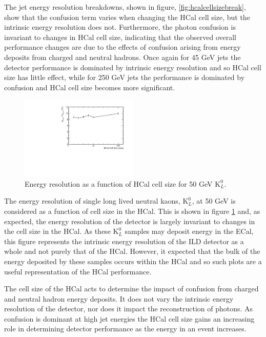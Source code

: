 The jet energy resolution breakdowns, shown in figure, \ref{fig:hcalcellsizebreak}, show that the confusion term varies when changing the HCal cell size, but the intrinsic energy resolution does not.  Furthermore, the photon confusion is invariant to changes in HCal cell size, indicating that the observed overall performance changes are due to the effects of confusion arising from energy deposits from charged and neutral hadrons.  Once again for 45 GeV jets the detector performance is dominated by intrinsic energy resolution and so HCal cell size has little effect, while for 250 GeV jets the performance is dominated by confusion and HCal cell size becomes more significant.  

\begin{figure}
\centering
\includegraphics[width=0.5\textwidth]{OptimisationStudies/Plots/EnergyResolution/ER_vs_HCalCellSize_50GeVKaon0L.pdf}
\caption[Energy resolution as a function of HCal cell size for 50 GeV $\text{K}^{0}_{L}$.]{Energy resolution as a function of HCal cell size for 50 GeV $\text{K}^{0}_{L}$.}
\label{fig:hcalcellskaon}
\end{figure}

The energy resolution of single long lived neutral kaons, $\text{K}^{0}_{L}$, at 50 GeV is considered as a function of cell size in the HCal.  This is shown in figure \ref{fig:hcalcellskaon} and, as expected, the energy resolution of the detector is largely invariant to changes in the cell size in the HCal.  As these $\text{K}^{0}_{L}$ samples may deposit energy in the ECal, this figure represents the intrinsic energy resolution of the ILD detector as a whole and not purely that of the HCal.  However, it expected that the bulk of the energy deposited by these samples occurs within the HCal and so such plots are a useful representation of the HCal performance.  

The cell size of the HCal acts to determine the impact of confusion from charged and neutral hadron energy deposits.  It does not vary the intrinsic energy resolution of the detector, nor does it impact the reconstruction of photons.  As confusion is dominant at high jet energies the HCal cell size gains an increasing role in determining detector performance as the energy in an event increases. 

